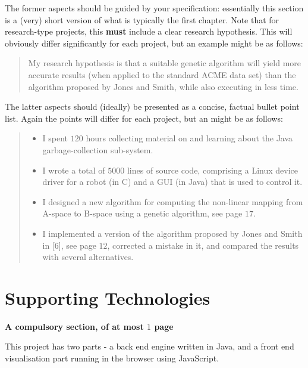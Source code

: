 \documentclass[ %
                    author={Alexander Hill},
                supervisor={Dr. Benjamin Sach},
                    degree={MEng},
                     title={MARMOSET: Multi Agent Routing for Managing Online Smart-cities for Efficient Transportation},
                  subtitle={},
                      type={research},
                      year={2016} ]{dissertation}
\begin{document}
The former aspects should be guided by your specification: essentially
this section is a (very) short version of what is typically the first
chapter.  Note that for research-type projects, this {\bf must} include
a clear research hypothesis.  This will obviously differ significantly
for each project, but an example might be as follows:

\begin{quote}
My research hypothesis is that a suitable genetic algorithm will yield
more accurate results (when applied to the standard ACME data set) than
the algorithm proposed by Jones and Smith, while also executing in less
time.
\end{quote}

\noindent
The latter aspects should (ideally) be presented as a concise, factual
bullet point list.  Again the points will differ for each project, but
an might be as follows:

\begin{quote}
\noindent
\begin{itemize}
\item I spent $120$ hours collecting material on and learning about the
      Java garbage-collection sub-system.
\item I wrote a total of $5000$ lines of source code, comprising a Linux
      device driver for a robot (in C) and a GUI (in Java) that is
      used to control it.
\item I designed a new algorithm for computing the non-linear mapping
      from A-space to B-space using a genetic algorithm, see page $17$.
\item I implemented a version of the algorithm proposed by Jones and
      Smith in [6], see page $12$, corrected a mistake in it, and
      compared the results with several alternatives.
\end{itemize}
\end{quote}


\chapter*{Supporting Technologies}

{\bf A compulsory section, of at most $1$ page}
\vspace{1cm}

\noindent
This project has two parts - a back end engine written in Java, and a front end
visualisation part running in the browser using JavaScript.
\end{document}

